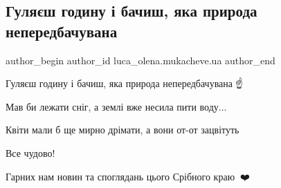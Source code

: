  
 
 
 
 

\subsection{Гуляєш годину і бачиш, яка природа непередбачувана}
\label{sec:21_01_2023.fb.luca_olena.mukacheve.ua.1.gulya_sh_godinu___ba}

\ifcmt
 author_begin
   author_id luca_olena.mukacheve.ua
 author_end
\fi

Гуляєш годину і бачиш, яка природа непередбачувана🤷☝️

Мав би лежати сніг, а землі вже несила пити воду...

Квіти мали б ще мирно дрімати, а вони от-от зацвітуть🤷

Все чудово!

Гарних нам новин та споглядань цього Срібного краю🙏🏻❤️
